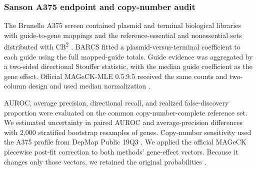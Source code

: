 \subsubsection{Sanson A375 endpoint and copy-number audit}

The Brunello A375 screen contained plasmid and terminal biological libraries
with guide-to-gene mappings and the reference-essential and nonessential sets
distributed with CB\textsuperscript{2} \citep{sanson2018optimized,
hart2017evaluation}.  BARCS fitted a plasmid-versus-terminal coefficient to
each guide using the full mapped-guide totals.  Guide evidence was aggregated
by a two-sided directional Stouffer statistic, with the median guide
coefficient as the gene effect.  Official MAGeCK-MLE 0.5.9.5 received the same
counts and two-column design and used median normalization
\citep{li2014mageck}.

AUROC, average precision, directional recall, and realized false-discovery
proportion were evaluated on the common copy-number-complete reference set. We
estimated uncertainty in paired AUROC and average-precision differences with
2,000 stratified bootstrap resamples of genes.  Copy-number sensitivity used
the A375 profile from DepMap Public 19Q3 \citep{depmap19q3}.  We applied the
official MAGeCK piecewise post-fit correction to both methods' gene-effect
vectors.  Because it changes only those vectors, we retained the original
probabilities \citep{meyers2017cnv}.
